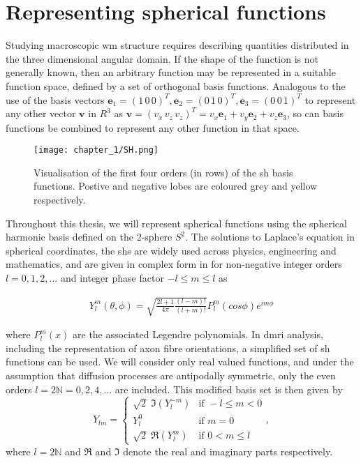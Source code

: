 \section{Representing spherical functions}
\label{sec:sh}


Studying macroscopic \gls{wm} structure requires describing quantities distributed in the three dimensional angular domain.
If the shape of the function is not generally known, then an arbitrary function may be represented in a suitable function space, defined by a set of orthogonal basis functions.
Analogous to the use of the basis vectors $\mathbf{e}_1=(1\,0\,0)^T, \mathbf{e}_2=(0\,1\,0)^T, \mathbf{e}_3=(0\,0\,1)^T$ to represent any other vector
$\mathbf{v}$ in $R^3$ as $\mathbf{v} =  (v_x\,v_z\,v_z)^T = v_x\mathbf{e}_1 + v_y\mathbf{e}_2 + v_z\mathbf{e}_3$,
so can basis functions be combined to represent any other function in that space.

\begin{SCfigure}
  \texttt{[image: chapter\_1/SH.png]}
  \caption{Visualisation of the first four orders (in rows) of the \gls{sh} basis functions. Postive and negative lobes are coloured grey and yellow respectively.}
  \label{fig:sh}
\end{SCfigure}

Throughout this thesis, we will represent spherical functions using the spherical harmonic basis defined on the 2-sphere $S^2$.
The solutions to Laplace's equation in spherical coordinates, the \glspl{sh} are widely used across physics, engineering and mathematics, and are given in complex form in for non-negative integer orders $l = 0, 1, 2,...$ and integer phase factor $-l \leqslant m \leqslant l$ as

\begin{align}
  Y_l^m(\theta,\phi) = \sqrt{ \frac{2l+1}{4\pi} \frac{(l-m)!}{(l+m)!} } P_l^m(cos\phi)e^{im\phi}
\end{align}

where $P_l^m(x)$ are the associated Legendre polynomials.
In \gls{dmri} analysis, including the representation of axon fibre orientations, a simplified set of \gls{sh} functions can be used.
We will consider only real valued functions, and under the assumption that diffusion processes are antipodally symmetric, only the even orders $l = 2 \mathbb{N} = 0,2,4,...$ are included.\autocite{Descoteaux2006}
This modified basis set is then given by
\begin{equation}
  Y_{lm} = \begin{cases}
              \sqrt{2} \; \Im (Y_l^{-m}) & \text{if } -l \leq m < 0 \\
              Y_l^0                      & \text{if } m=0 \\
              \sqrt{2} \; \Re (Y_l^m)    & \text{if } 0 < m \leq l
           \end{cases}, \label{eq:sh}
\end{equation}
where $l = 2\mathbb{N}$ and $\Re$ and $\Im$ denote the real and imaginary parts respectively.

